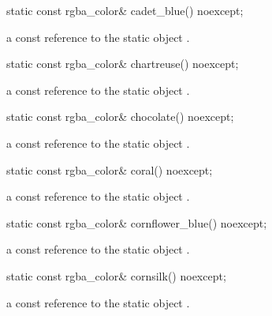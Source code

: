 \begin{itemdecl}
static const rgba_color& cadet_blue() noexcept;
\end{itemdecl}
\begin{itemdescr}
\pnum
\returns
a const reference to the static  object .
\end{itemdescr}

\begin{itemdecl}
static const rgba_color& chartreuse() noexcept;
\end{itemdecl}
\begin{itemdescr}
\pnum
\returns
a const reference to the static  object .
\end{itemdescr}

\begin{itemdecl}
static const rgba_color& chocolate() noexcept;
\end{itemdecl}
\begin{itemdescr}
\pnum
\returns
a const reference to the static  object .
\end{itemdescr}

\begin{itemdecl}
static const rgba_color& coral() noexcept;
\end{itemdecl}
\begin{itemdescr}
\pnum
\returns
a const reference to the static  object .
\end{itemdescr}

\begin{itemdecl}
static const rgba_color& cornflower_blue() noexcept;
\end{itemdecl}
\begin{itemdescr}
\pnum
\returns
a const reference to the static  object .
\end{itemdescr}

\begin{itemdecl}
static const rgba_color& cornsilk() noexcept;
\end{itemdecl}
\begin{itemdescr}
\pnum
\returns
a const reference to the static  object .
\end{itemdescr}

